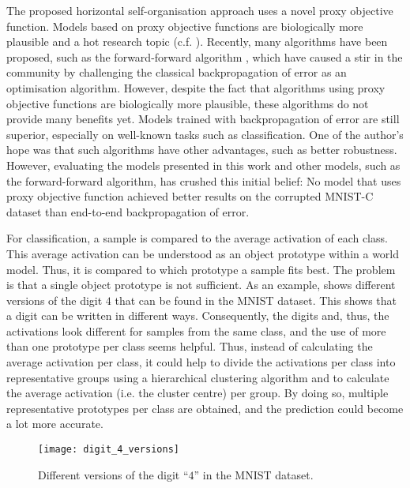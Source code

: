The proposed horizontal self-organisation approach uses a novel proxy objective function. Models based on proxy objective functions are biologically more plausible and a hot research topic (c.f. ). Recently, many algorithms have been proposed, such as the forward-forward algorithm , which have caused a stir in the community by challenging the classical backpropagation of error as an optimisation algorithm. However, despite the fact that algorithms using proxy objective functions are biologically more plausible, these algorithms do not provide many benefits yet. Models trained with backpropagation of error are still superior, especially on well-known tasks such as classification. One of the author's hope was that such algorithms have other advantages, such as better robustness. However, evaluating the models presented in this work and other models, such as the forward-forward algorithm, has crushed this initial belief: No model that uses proxy objective function achieved better results on the corrupted MNIST-C dataset than end-to-end backpropagation of error.

For classification, a sample is compared to the average activation of each class. This average activation can be understood as an object prototype within a world model. Thus, it is compared to which prototype a sample fits best. The problem is that a single object prototype is not sufficient. As an example,  shows different versions of the digit $4$ that can be found in the MNIST dataset. This shows that a digit can be written in different ways.
Consequently, the digits and, thus, the activations look different for samples from the same class, and the use of more than one prototype per class seems helpful. Thus, instead of calculating the average activation per class, it could help to divide the activations per class into representative groups using a hierarchical clustering algorithm and to calculate the average activation (i.e. the cluster centre) per group. By doing so, multiple representative prototypes per class are obtained, and the prediction could become a lot more accurate.

\begin{figure}[h]
    \centering
    \texttt{[image: digit\_4\_versions]}
    \caption[Different versions of the digit ``$4$'' in the MNIST dataset]{Different versions of the digit ``$4$'' in the MNIST dataset.}
\end{figure}


